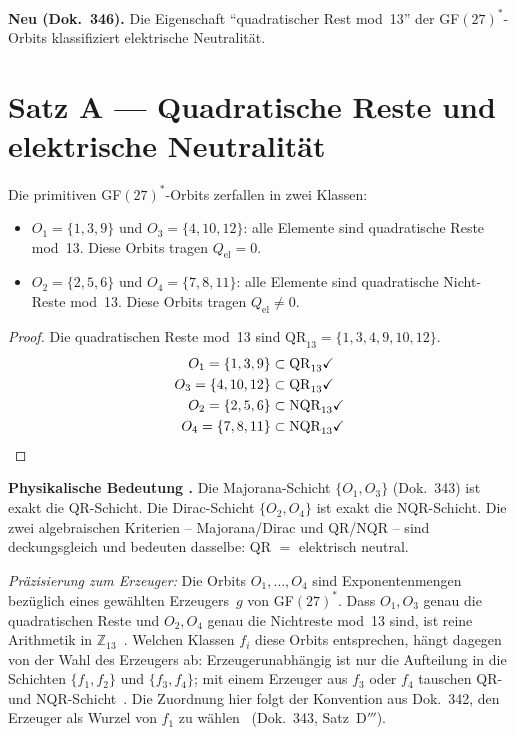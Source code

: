\textbf{Neu (Dok.~346).} Die Eigenschaft ``quadratischer Rest mod~13'' der
GF$(27)^*$-Orbits klassifiziert elektrische Neutralität.

\section{Satz A --- Quadratische Reste und elektrische Neutralität}

\begin{theorem}
Die primitiven GF$(27)^*$-Orbits zerfallen in zwei Klassen:
\begin{itemize}
\item $O_1=\{1,3,9\}$ und $O_3=\{4,10,12\}$: alle Elemente sind
  quadratische Reste mod~13. Diese Orbits tragen $Q_\mathrm{el}=0$.
\item $O_2=\{2,5,6\}$ und $O_4=\{7,8,11\}$: alle Elemente sind
  quadratische Nicht-Reste mod~13. Diese Orbits tragen $Q_\mathrm{el}\neq0$.
\end{itemize}
\end{theorem}

\begin{proof}
Die quadratischen Reste mod~13 sind $\mathrm{QR}_{13}=\{1,3,4,9,10,12\}$.
\begin{align}
O_1=\{1,3,9\} &\subset \mathrm{QR}_{13} \checkmark \notag\\
O_3=\{4,10,12\} &\subset \mathrm{QR}_{13} \checkmark \notag\\
O_2=\{2,5,6\} &\subset \mathrm{NQR}_{13} \checkmark \notag\\
O_4=\{7,8,11\} &\subset \mathrm{NQR}_{13} \checkmark \notag
\end{align}
\end{proof}

\textbf{Physikalische Bedeutung \BM.} Die Majorana-Schicht $\{O_1,O_3\}$ (Dok.~343)
ist exakt die QR-Schicht. Die Dirac-Schicht $\{O_2,O_4\}$ ist exakt die NQR-Schicht.
Die zwei algebraischen Kriterien -- Majorana/Dirac und QR/NQR -- sind
deckungsgleich und bedeuten dasselbe: QR $=$ elektrisch neutral.

\noindent\textit{Präzisierung zum Erzeuger:} Die Orbits $O_1,\dots,O_4$ sind
Exponentenmengen bezüglich eines gewählten Erzeugers~$g$ von GF$(27)^*$. Dass
$O_1,O_3$ genau die quadratischen Reste und $O_2,O_4$ genau die Nichtreste
mod~13 sind, ist reine Arithmetik in $\mathbb{Z}_{13}$ \BM\,\LM. Welchen Klassen
$f_i$ diese Orbits entsprechen, hängt dagegen von der Wahl des Erzeugers ab:
Erzeugerunabhängig ist nur die Aufteilung in die Schichten $\{f_1,f_2\}$ und
$\{f_3,f_4\}$; mit einem Erzeuger aus $f_3$ oder $f_4$ tauschen QR- und
NQR-Schicht \BM\,\LM. Die Zuordnung hier folgt der Konvention aus Dok.~342,
den Erzeuger als Wurzel von $f_1$ zu wählen \SetzM\ (Dok.~343, Satz~D$'''$).

